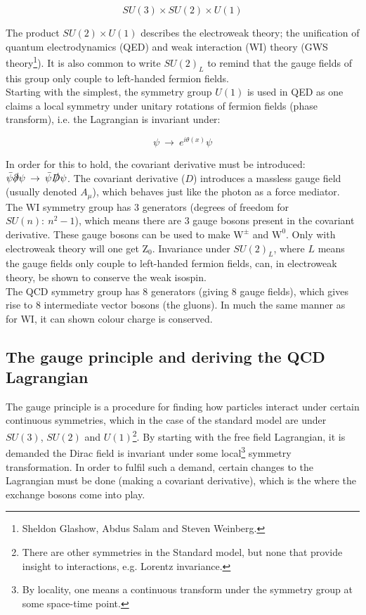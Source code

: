 \documentclass[11pt,a4paper]{article}
\begin{document}
\begin{equation}
	SU(3) \times SU(2) \times U(1)
\end{equation}

The product $SU(2) \times U(1)$ describes the electroweak theory; the unification of quantum electrodynamics (QED) and weak interaction (WI) theory (GWS theory\footnote{Sheldon Glashow, Abdus Salam and Steven Weinberg.}). It is also common to write $SU(2)_L$ to remind that the gauge fields of this group only couple to left-handed fermion fields.\\

Starting with the simplest, the symmetry group $U(1)$ is used in QED as one claims a local symmetry under unitary rotations of fermion fields (phase transform), i.e. the Lagrangian is invariant under:

\begin{equation}
	\psi \:\rightarrow\: e^{i\theta(x)}\psi
\end{equation} 

In order for this to hold, the covariant derivative must be introduced: $\bar{\psi}\slashed\partial\psi \:\rightarrow\: \bar{\psi}\slashed D\psi$. The covariant derivative ($D$) introduces a massless gauge field (usually denoted $A_\mu$), which behaves just like the photon as a force mediator.\\

The WI symmetry group has 3 generators (degrees of freedom for $SU(n):\:n^2-1$), which means there are 3 gauge bosons present in the covariant derivative. These gauge bosons can be used to make $\text{W}^\pm$ and $\text{W}^0$. Only with electroweak theory will one get $\text{Z}_ 0$. Invariance under $SU(2)_L$, where $L$ means the gauge fields only couple to left-handed fermion fields, can, in electroweak theory, be shown to conserve the weak isospin.\\

The QCD symmetry group has 8 generators (giving 8 gauge fields), which gives rise to 8 intermediate vector bosons (the gluons). In much the same manner as for WI, it can shown colour charge is conserved.

\subsection{The gauge principle and deriving the QCD Lagrangian}
The gauge principle is a procedure for finding how particles interact under certain continuous symmetries, which in the case of the standard model are under $SU(3)$, $SU(2)$ and $U(1)$\footnote{There are other symmetries in the Standard model, but none that provide insight to interactions, e.g. Lorentz invariance.}. By starting with the free field Lagrangian, it is demanded the Dirac field is invariant under some local\footnote{By locality, one means a continuous transform under the symmetry group at some space-time point.} symmetry transformation. In order to fulfil such a demand, certain changes to the Lagrangian must be done (making a covariant derivative), which is the where the exchange bosons come into play.\\
\end{document}
